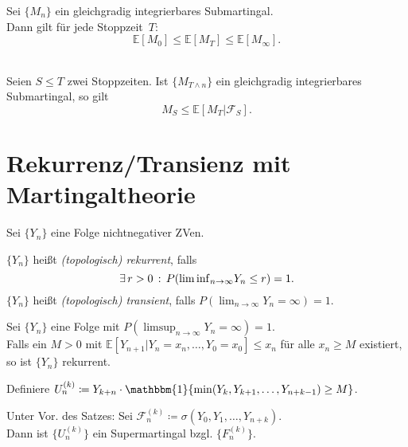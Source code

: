 \documentclass{cheat-sheet}
\newcommand{\E}{\mathbb{E}} %
\newcommand{\ind}{\mathbbm{1}} %
\newcommand{\Filt}{\mathcal{F}} %
\begin{document}
\begin{satz}
  Sei $\{ M_n \}$ ein gleichgradig integrierbares Submartingal. \\
  Dann gilt für jede Stoppzeit~$T$:
  \[ \E[M_0] \leq \E[M_T] \leq \E[M_\infty]. \]
\end{satz}

\begin{satz} \mbox{}\\
  Seien $S \leq T$ zwei Stoppzeiten.
  Ist $\{ M_{T \wedge n} \}$ ein gleichgradig integrierbares Submartingal, so gilt
  \[
    M_S \leq \E[ M_T | \Filt_S ].
  \]
\end{satz}

\section{Rekurrenz/Transienz mit Martingaltheorie}


Sei $\{ Y_n \}$ eine Folge nichtnegativer ZVen.

\begin{defn}
  $\{ Y_n \}$ heißt \emph{(topologisch) rekurrent}, falls
  \[ \exists \, {r > 0} \,:\, P({\liminf}_{n \to \infty} Y_n \leq r) = 1. \]
  $\{ Y_n \}$ heißt \emph{(topologisch) transient}, falls $P({\lim}_{n \to \infty} Y_n = \infty) = 1$.
\end{defn}

\begin{satz}
  Sei $\{ Y_n \}$ eine Folge mit $P({\limsup}_{n \to \infty} Y_n = \infty) = 1$. \\
  Falls ein $M > 0$ mit $\E[ Y_{n+1} | Y_n = x_n, \ldots, Y_0 = x_0 ] \leq x_n$ für alle $x_n \geq M$ existiert, so ist $\{ Y_n \}$ rekurrent.
\end{satz}

Definiere $U_n^{(k)} \coloneqq Y_{k+n} \cdot \ind \{ \min(Y_k, Y_{k+1}, \ldots, Y_{n+k-1}) \geq M \}$.

\begin{lem}
  \begin{minipage}[t]{0.8 \linewidth}
    Unter Vor. des Satzes:
    Sei $\Filt_n^{(k)} \coloneqq \sigma(Y_0, Y_1, \ldots, Y_{n+k})$. \\
    Dann ist $\{ U_n^{(k)} \}$ ein Supermartingal bzgl. $\{ F_n^{(k)} \}$.
  \end{minipage}
\end{lem}
\end{document}
